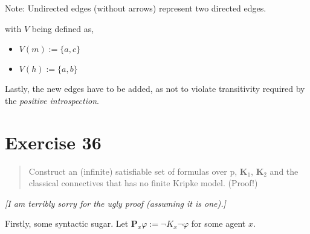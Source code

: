 \documentclass[11pt,a4paper]{article}
\newcommand{\eall}{\mathbf{K}}
\newcommand{\esome}{\mathbf{P}}
\begin{document}
Note: Undirected edges (without arrows) represent two directed edges.
\begin{center}
\end{center}
with $V$ being defined as,
\begin{itemize}
\item $V(m):=\{a,c\}$
\item $V(h):=\{a,b\}$
\end{itemize}
Lastly, the new edges have to be added, as not to violate transitivity required by the \emph{positive introspection}.

\section*{Exercise 36}
\begin{quote}
Construct an (infinite) satisfiable set of formulas over p, $\eall_1$, $\eall_2$ and the classical connectives that has no finite Kripke model. (Proof!)
\end{quote}

\textit{[I am terribly sorry for the ugly proof (assuming it is one).]}

Firstly, some syntactic sugar. Let $\esome_x \varphi := \neg K_x \neg \varphi$ for some agent $x$.
\end{document}
